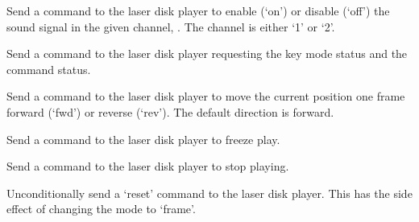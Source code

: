  Send a command to the laser disk player to enable (`on') or disable (`off') the sound signal in
  the given channel, .
  The channel is either `1' or `2'.
  
  Send a command to the laser disk player requesting the key mode status and the command status.
  
  Send a command to the laser disk player to move the current position one frame forward (`fwd') or
  reverse (`rev').
  The default direction is forward.
  
  Send a command to the laser disk player to freeze play.
  
  Send a command to the laser disk player to stop playing.
  
  Unconditionally send a `reset' command to the laser disk player.
  This has the side effect of changing the mode to `frame'.
  
  \objListCmdEnd

\objItemFile

\objItemMessage


